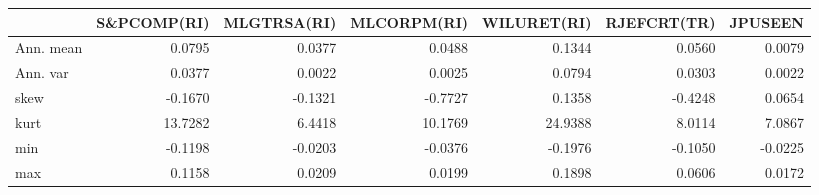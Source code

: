 \begin{tabular}{lrrrrrr}
\toprule
{} &  S\&PCOMP(RI) &  MLGTRSA(RI) &  MLCORPM(RI) &  WILURET(RI) &  RJEFCRT(TR) &  JPUSEEN \\
\midrule
Ann. mean &       0.0795 &       0.0377 &       0.0488 &       0.1344 &       0.0560 &   0.0079 \\
Ann. var  &       0.0377 &       0.0022 &       0.0025 &       0.0794 &       0.0303 &   0.0022 \\
skew      &      -0.1670 &      -0.1321 &      -0.7727 &       0.1358 &      -0.4248 &   0.0654 \\
kurt      &      13.7282 &       6.4418 &      10.1769 &      24.9388 &       8.0114 &   7.0867 \\
min       &      -0.1198 &      -0.0203 &      -0.0376 &      -0.1976 &      -0.1050 &  -0.0225 \\
max       &       0.1158 &       0.0209 &       0.0199 &       0.1898 &       0.0606 &   0.0172 \\
\bottomrule
\end{tabular}
